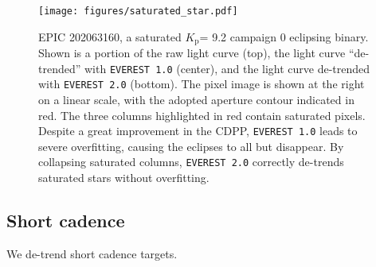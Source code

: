 \documentclass[]{emulateapj}
\newcommand{\Kp}{\ensuremath{K_\mathrm{p}}}
\begin{document}
\begin{figure}[ht]
  \begin{center}
      \texttt{[image: figures/saturated\_star.pdf]}
       \caption{EPIC 202063160, a saturated \Kp = 9.2 campaign 0 eclipsing
       binary. Shown is a portion of the raw light curve (top), the light curve ``de-trended''
       with \texttt{EVEREST 1.0} (center), and the light curve de-trended with \texttt{EVEREST 2.0}
       (bottom). The pixel image is shown at the right on a linear scale, with the adopted aperture
       contour indicated in red. The three columns highlighted in red contain saturated
       pixels. Despite a great improvement in the CDPP, \texttt{EVEREST 1.0} leads to severe
       overfitting, causing the eclipses to all but disappear. By collapsing saturated columns,
       \texttt{EVEREST 2.0} correctly de-trends saturated stars without overfitting.}
     \label{fig:saturated_star}
  \end{center}
\end{figure}

\subsection{Short cadence}
\label{sec:impl_shortcad}
We de-trend short cadence targets.
\end{document}
